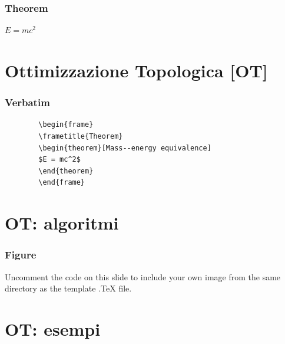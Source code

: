 \documentclass{beamer}
\begin{document}



\begin{frame}
	\frametitle{Theorem}
	\begin{theorem}
		$E = mc^2$
	\end{theorem}
\end{frame}


\section{Ottimizzazione Topologica [OT]}



\begin{frame}[fragile] %
	\frametitle{Verbatim}
	\begin{example}
		\begin{verbatim}
		\begin{frame}
		\frametitle{Theorem}
		\begin{theorem}[Mass--energy equivalence]
		$E = mc^2$
		\end{theorem}
		\end{frame}\end{verbatim}
	\end{example}
\end{frame}




\section{OT: algoritmi}



\begin{frame}
	\frametitle{Figure}
	Uncomment the code on this slide to include your own image from the same directory as the template .TeX file.
\end{frame}


\section{OT: esempi}
\end{document}
